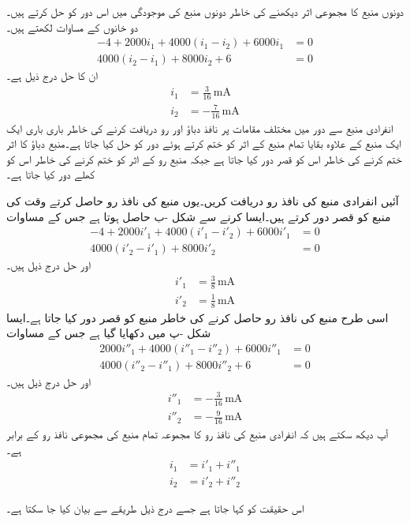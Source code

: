 دونوں منبع کا مجموعی اثر دیکھنے کی خاطر دونوں منبع کی موجودگی میں اس دور کو حل کرتے ہیں۔دو خانوں کے مساوات لکھتے ہیں۔
\begin{align*}
-4+2000i_1+4000(i_1-i_2)+6000i_1&=0\\
4000(i_2-i_1)+8000i_2+6&=0
\end{align*}
ان کا حل درج ذیل ہے۔
\begin{align*}
i_1&=\frac{3}{16}\, \si{\milli\ampere}\\
i_2&=-\frac{7}{16}\, \si{\milli\ampere}
\end{align*}
انفرادی منبع سے دور میں مختلف مقامات پر نافذ دباؤ اور رو دریافت کرنے کی خاطر باری باری ایک ایک منبع کے علاوہ بقایا تمام منبع کے اثر کو ختم کرتے ہوئے دور کو حل کیا جاتا ہے۔منبع دباؤ کا اثر ختم کرنے کی خاطر اس کو قصر دور کیا جاتا ہے جبکہ منبع رو کے اثر کو ختم کرنے کی خاطر اس کو کھلے دور کیا جاتا ہے۔

آئیں انفرادی منبع کی نافذ رو دریافت کریں۔یوں   منبع کی نافذ رو حاصل کرتے وقت  کی منبع کو قصر دور کرتے ہیں۔ایسا کرنے سے شکل -ب حاصل ہوتا ہے جس کے مساوات
\begin{align*}
-4+2000i'_1+4000(i'_1-i'_2)+6000i'_1&=0\\
4000(i'_2-i'_1)+8000i'_2&=0
\end{align*}
اور حل درج ذیل ہیں۔
\begin{align*}
i'_1&=\frac{3}{8}\, \si{\milli\ampere}\\
i'_2&=\frac{1}{8}\, \si{\milli\ampere}
\end{align*}
اسی طرح  منبع کی نافذ رو حاصل کرنے کی خاطر  منبع کو قصر دور کیا جاتا ہے۔ایسا شکل -پ میں دکھایا گیا ہے جس کے مساوات
\begin{align*}
2000i''_1+4000(i''_1-i''_2)+6000i''_1&=0\\
4000(i''_2-i''_1)+8000i''_2+6&=0
\end{align*}
اور حل درج ذیل ہیں۔
\begin{align*}
i''_1&=-\frac{3}{16}\, \si{\milli\ampere}\\
i''_2&=-\frac{9}{16}\, \si{\milli\ampere}
\end{align*}
آپ دیکھ سکتے ہیں کہ انفرادی منبع کی نافذ رو  کا مجموعہ تمام منبع کی مجموعی نافذ رو کے برابر ہے۔
\begin{align*}
i_1&=i'_1+i''_1\\
i_2&=i'_2+i''_2
\end{align*}

اس حقیقت کو  کہا جاتا ہے  جسے درج ذیل طریقے سے بیان کیا جا سکتا ہے۔

